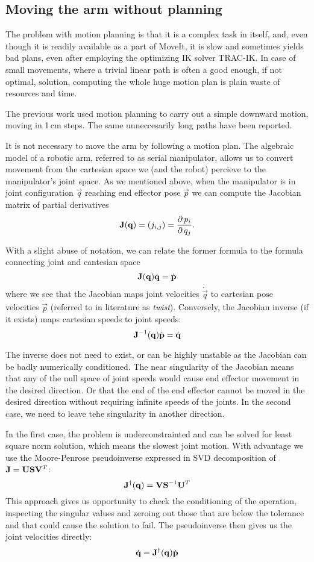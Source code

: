 \documentclass[buriama8_dp.tex]{subfiles}
\begin{document}
\subsection{Moving the arm without planning}
\label{subsec:label}

The problem with motion planning is that it is a complex task in itself, and, even though it is readily available as a part of MoveIt, it is slow and sometimes yields bad plans, even after employing the optimizing IK solver TRAC-IK. In case of small movements, where a trivial linear path is often a good enough, if not optimal, solution, computing the whole huge motion plan is plain waste of resources and time.

The previous work \cite{vojta} used motion planning to carry out a simple downward motion, moving in 1\,cm steps. The same unneccesarily long paths have been reported.

It is not necessary to move the arm by following a motion plan. The algebraic model of a robotic arm, referred to as serial manipulator, allows us to convert movement from the cartesian space we (and the robot) percieve to the manipulator's joint space. As we mentioned above, when the manipulator is in joint configuration \(\vec q\) reaching end effector pose \(\vec p\) we can compute the Jacobian matrix of partial derivatives
\[
\mathbf{J}(\mathbf{q}) = (j_{i,j})= \frac{\partial\,{p_i}}{\partial\, q_j}.
\label{eq:jacob}
\]

With a slight abuse of notation, we can relate the former formula to the formula connecting joint and cantesian space
\[
\mathbf{J}(\mathbf{q}) \dot{\mathbf{q}} = \dot{\mathbf{p}}
\]
where we see that the Jacobian maps joint velocities \(\dot{\vec{q}}\) to cartesian pose velocities \(\dot{\vec{p}}\) (referred to in literature as \emph{twist}). Conversely, the Jacobian inverse (if it exists) maps cartesian speeds to joint speeds:
\[
\mathbf{J}^{-1}(\mathbf{q}) \dot{\mathbf{p}} = \dot{\mathbf{q}}
\]

The inverse does not need to exist, or can be highly unstable as the Jacobian can be badly numerically conditioned. The near singularity of the Jacobian means that any of the null space of joint speeds would cause end effector movement in the desired direction. Or that the end of the end effector cannot be moved in the desired direction without requiring infinite speeds of the joints. In the second case, we need to leave tehe singularity in another direction.

In the first case, the problem is underconstrainted and can be solved for least square norm solution, which means the slowest joint motion. With advantage we use the Moore-Penrose pseudoinverse expressed in SVD decomposition of \(\mathbf{J} = \mathbf{U} \mathbf{S} \mathbf{V}^T \):
\[
\mathbf{J}^\dagger(\mathbf{q}) = \mathbf{V} \mathbf{S}^{-1} \mathbf{U}^T
\]
This approach gives us opportunity to check the conditioning of the operation, inspecting the singular values and zeroing out those that are below the tolerance and that could cause the solution to fail. The pseudoinverse then gives us the joint velocities directly:
\[
 \dot{\mathbf{q}} = \mathbf{J}^\dagger(\mathbf{q}) \dot{\mathbf{p}}
\]
\end{document}
